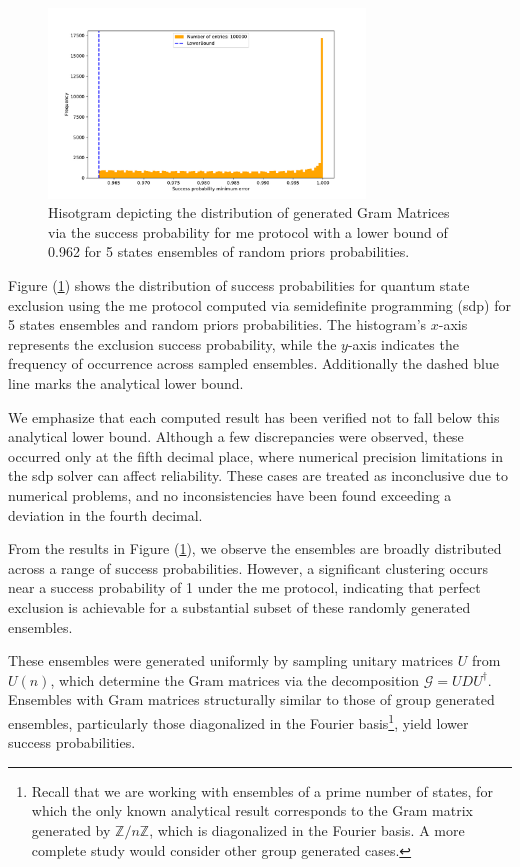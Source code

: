 \documentclass[12pt,letterpaper]{article}
\begin{document}
\begin{figure}[H]
	\centering
	\includegraphics[width=0.75\textwidth, trim={1.0cm 0.3cm 2.4cm 1.5cm}, clip]{../Plots/ExclusionMinimumErrorRandomDistributionZ3Prob0.962.pdf}
	\caption{Hisotgram depicting the distribution of generated Gram Matrices via the success probability for \gls{me} protocol with a lower bound of 0.962 for 5 states ensembles of random priors probabilities.}
	\label{FigureDistZ5ME0.962}
\end{figure}

Figure (\ref{FigureDistZ5ME0.962}) shows the distribution of success probabilities for quantum state exclusion using the \gls{me} protocol computed via semidefinite programming (\gls{sdp}) for 5 states ensembles and random priors probabilities. The histogram's $x$-axis represents the exclusion success probability, while the $y$-axis indicates the frequency of occurrence across sampled ensembles. Additionally the dashed blue line marks the analytical lower bound.

We emphasize that each computed result has been verified not to fall below this analytical lower bound. Although a few discrepancies were observed, these occurred only at the fifth decimal place, where numerical precision limitations in the \gls{sdp} solver can affect reliability. These cases are treated as inconclusive due to numerical problems, and no inconsistencies have been found exceeding a deviation in the fourth decimal.

From the results in Figure (\ref{FigureDistZ5ME0.962}), we observe the ensembles are broadly distributed across a range of success probabilities. However, a significant clustering occurs near a success probability of 1 under the \gls{me} protocol, indicating that perfect exclusion is achievable for a substantial subset of these randomly generated ensembles.

These ensembles were generated uniformly by sampling unitary matrices $ U $ from $U(n)$, which determine the Gram matrices via the decomposition $\mathcal{G} = U D U^\dagger$. Ensembles with Gram matrices structurally similar to those of group generated ensembles, particularly those diagonalized in the Fourier basis\footnote{Recall that we are working with ensembles of a prime number of states, for which the only known analytical result corresponds to the Gram matrix generated by $\mathbb{Z}/n\mathbb{Z}$, which is diagonalized in the Fourier basis. A more complete study would consider other group generated cases.}, yield lower success probabilities. 
\end{document}
